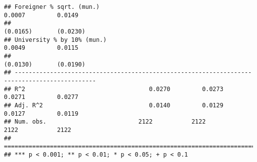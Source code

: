 \documentclass[
]{article}
\begin{document}
\begin{verbatim}
## Foreigner % sqrt. (mun.)                                            0.0007         0.0149    
##                                                                    (0.0165)       (0.0230)   
## University % by 10% (mun.)                                          0.0049         0.0115    
##                                                                    (0.0130)       (0.0190)   
## ---------------------------------------------------------------------------------------------
## R^2                                   0.0270         0.0273         0.0271         0.0277    
## Adj. R^2                              0.0140         0.0129         0.0127         0.0119    
## Num. obs.                          2122           2122           2122           2122         
## =============================================================================================
## *** p < 0.001; ** p < 0.01; * p < 0.05; + p < 0.1
\end{verbatim}
\end{document}
